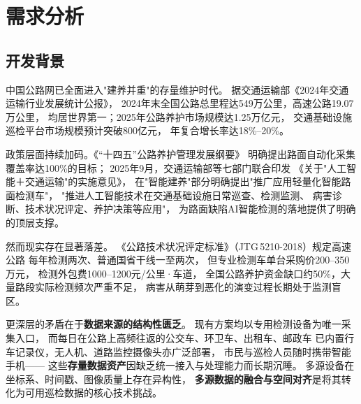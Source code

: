 \documentclass[UTF8, a4paper, fontset=ubuntu]{ctexart}
\begin{document}


\setcounter{tocdepth}{2}
\pagestyle{plain}
\tableofcontents      %
\clearpage            %

\setcounter{page}{1}   %

\section{需求分析}                                                                                                                                                 
  \subsection{开发背景}                                                                                       
  中国公路网已全面进入"建养并重"的存量维护时代。
  据交通运输部《2024年交通运输行业发展统计公报》\cite{mottstat2024}，
  2024年末全国公路总里程达549万公里，高速公路19.07万公里，
  均居世界第一；2025年公路养护市场规模达1.25万亿元，
  交通基础设施巡检平台市场规模预计突破800亿元，
  年复合增长率达18\%--20\%。

  政策层面持续加码。《“十四五”公路养护管理发展纲要》\cite{shiswu2022}
  明确提出路面自动化采集覆盖率达100\%的目标；
  2025年9月，交通运输部等七部门联合印发
  《关于"人工智能＋交通运输"的实施意见》\cite{aiplus2025}，
  在"智能建养"部分明确提出"推广应用轻量化智能路面检测车"，
  "推进人工智能技术在交通基础设施日常巡查、检测监测、
  病害诊断、技术状况评定、养护决策等应用"，
  为路面缺陷AI智能检测的落地提供了明确的顶层支撑。

  然而现实存在显著落差。
  《公路技术状况评定标准》（JTG\,5210-2018）\cite{jtg52102018}规定高速公路
  每年检测两次、普通国省干线一至两次，
  但专业检测车单台采购价200--350万元，
  检测外包费1000--1200元/公里·车道，
  全国公路养护资金缺口约50\%，大量路段实际检测频次严重不足，
  病害从萌芽到恶化的演变过程长期处于监测盲区。

  更深层的矛盾在于\textbf{数据来源的结构性匮乏}。
  现有方案均以专用检测设备为唯一采集入口，
  而每日在公路上高频往返的公交车、环卫车、出租车、邮政车
  已内置行车记录仪，无人机、道路监控摄像头亦广泛部署，
  市民与巡检人员随时携带智能手机——
  这些\textbf{存量数据资产}因缺乏统一接入与处理能力而长期沉睡。
  多源设备在坐标系、时间戳、图像质量上存在异构性，
  \textbf{多源数据的融合与空间对齐}是将其转化为可用巡检数据的核心技术挑战。
\end{document}
